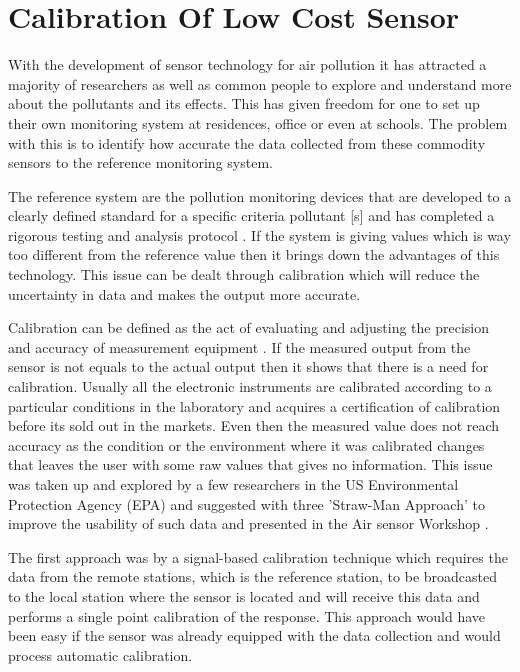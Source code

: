 \chapter{Calibration Of Low Cost Sensor}

With the development of sensor technology for air pollution it has attracted a majority of researchers as well as common people to explore and understand more about the pollutants and its effects. This has given freedom for one to set up their own monitoring system at residences, office or even at schools. The problem with this is to identify how accurate the data collected from these commodity sensors to the reference monitoring system. 

The reference system are the pollution monitoring devices that are developed to a clearly defined standard for a specific criteria pollutant [s] and has completed a rigorous testing and analysis protocol \cite{Hall2014}. If the system is giving values which is way too different from the reference value then it brings down the advantages of this technology. This issue can be dealt through calibration which will reduce the uncertainty in data and makes the output more accurate. 
\par 
Calibration can be defined as the act of evaluating and adjusting the precision and accuracy of measurement equipment \cite{Kejuruteraan2018}. If the measured output from the sensor is not equals to the actual output then it shows that there is a need for calibration. Usually all the electronic instruments are calibrated according to a particular conditions in the laboratory and acquires a certification of calibration before its sold out in the markets. Even then the measured value does not reach accuracy as the condition or the environment where it was calibrated changes that leaves the user with some raw values that gives no information. This issue was taken up and explored by a few researchers in the US Environmental Protection Agency (EPA) and suggested with three 'Straw-Man Approach' to improve the usability of such data and presented in the Air sensor Workshop \cite{Williams2013}. 

The first approach was by a signal-based calibration technique which requires the data from the remote stations, which is the reference station, to be broadcasted to the local station where the sensor is located and will receive this data and performs a single point calibration of the response. This approach would have been easy if the sensor was already equipped with the data collection and would process automatic calibration. 


